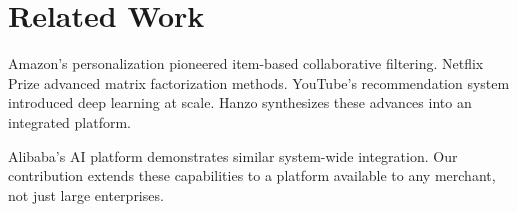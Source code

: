 \section{Related Work}


Amazon's personalization \cite{linden2003} pioneered item-based collaborative filtering. Netflix Prize \cite{netflix2009} advanced matrix factorization methods. YouTube's recommendation system \cite{youtube2016} introduced deep learning at scale. Hanzo synthesizes these advances into an integrated platform.

Alibaba's AI platform \cite{alibaba2017} demonstrates similar system-wide integration. Our contribution extends these capabilities to a platform available to any merchant, not just large enterprises.

